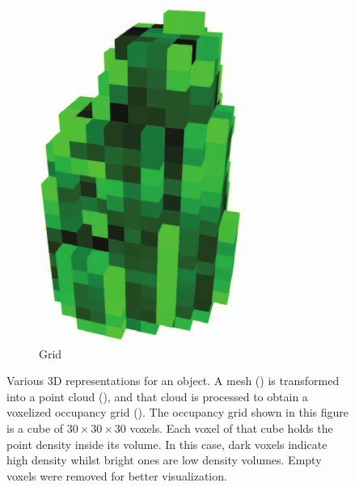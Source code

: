 \begin{figure}
\begin{subfigure}{0.3\linewidth}
    \includegraphics[width=0.9\linewidth]{Figures/ObjRecog/grid.png}
    \caption{Grid}
    \label{fig:objrecog:meshcloudgrid:grid}
  \end{subfigure}
  \caption{Various 3D representations for an object. A mesh () is transformed into a point cloud (), and that cloud is processed to obtain a voxelized occupancy grid (). The occupancy grid shown in this figure is a cube of $30\times 30 \times 30$ voxels. Each voxel of that cube holds the point density inside its volume. In this case, dark voxels indicate high density whilst bright ones are low density volumes. Empty voxels were removed for better visualization.}
  \label{fig:objrecog:meshcloudgrid}
\end{figure}


